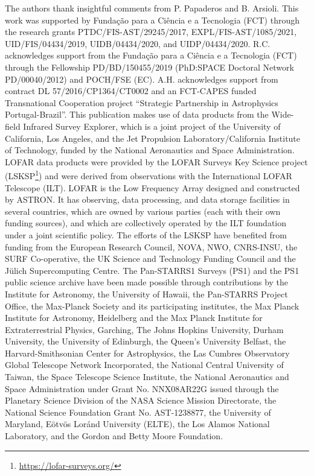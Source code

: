 \documentclass{aa}
\begin{document}
\begin{acknowledgements}
The authors thank insightful comments from P. Papaderos and B. Arsioli.
This work was supported by Fundação para a Ciência e a Tecnologia (FCT) through the research grants PTDC/FIS-AST/29245/2017, EXPL/FIS-AST/1085/2021, UID/FIS/04434/2019, UIDB/04434/2020, and UIDP/04434/2020. R.C. acknowledges support from the Fundação para a Ciência e a Tecnologia (FCT) through the Fellowship PD/BD/150455/2019 (PhD:SPACE Doctoral Network PD/00040/2012) and POCH/FSE (EC). A.H. acknowledges support from contract DL 57/2016/CP1364/CT0002 and an FCT-CAPES funded Transnational Cooperation project ``Strategic Partnership in Astrophysics Portugal-Brazil''.
This publication makes use of data products from the Wide-field Infrared Survey Explorer, which is a joint project of the University of California, Los Angeles, and the Jet Propulsion Laboratory/California Institute of Technology, funded by the National Aeronautics and Space Administration.
LOFAR data products were provided by the LOFAR Surveys Key Science project (LSKSP\footnote{\url{https://lofar-surveys.org/}}) and were derived from observations with the International LOFAR Telescope (ILT). LOFAR \citep{2013A&A...556A...2V} is the Low Frequency Array designed and constructed by ASTRON. It has observing, data processing, and data storage facilities in several countries, which are owned by various parties (each with their own funding sources), and which are collectively operated by the ILT foundation under a joint scientific policy. The efforts of the LSKSP have benefited from funding from the European Research Council, NOVA, NWO, CNRS-INSU, the SURF Co-operative, the UK Science and Technology Funding Council and the Jülich Supercomputing Centre.
The Pan-STARRS1 Surveys (PS1) and the PS1 public science archive have been made possible through contributions by the Institute for Astronomy, the University of Hawaii, the Pan-STARRS Project Office, the Max-Planck Society and its participating institutes, the Max Planck Institute for Astronomy, Heidelberg and the Max Planck Institute for Extraterrestrial Physics, Garching, The Johns Hopkins University, Durham University, the University of Edinburgh, the Queen's University Belfast, the Harvard-Smithsonian Center for Astrophysics, the Las Cumbres Observatory Global Telescope Network Incorporated, the National Central University of Taiwan, the Space Telescope Science Institute, the National Aeronautics and Space Administration under Grant No. NNX08AR22G issued through the Planetary Science Division of the NASA Science Mission Directorate, the National Science Foundation Grant No. AST-1238877, the University of Maryland, E\"{o}tv\"{o}s Lor\'{a}nd University (ELTE), the Los Alamos National Laboratory, and the Gordon and Betty Moore Foundation.

\end{acknowledgements}
\end{document}
